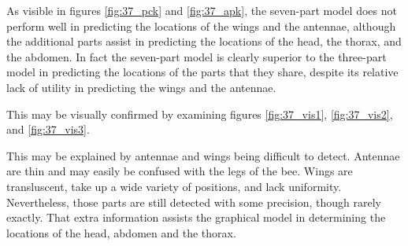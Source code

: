 \documentclass[11pt, oneside]{report}
\begin{document}
        As visible in figures \ref{fig:37_pck} and \ref{fig:37_apk}, the seven-part model does not perform well in predicting the locations of the wings and the antennae, although the additional parts assist in predicting the locations of the head, the thorax, and the abdomen. In fact the seven-part model is clearly superior to the three-part model in predicting the locations of the parts that they share, despite its relative lack of utility in predicting the wings and the antennae.

        This may be visually confirmed by examining figures \ref{fig:37_vis1}, \ref{fig:37_vis2}, and \ref{fig:37_vis3}.

        This may be explained by antennae and wings being difficult to detect. Antennae are thin and may easily be confused with the legs of the bee. Wings are transluscent, take up a wide variety of positions, and lack uniformity. Nevertheless, those parts are still detected with some precision, though rarely exactly. That extra information assists the graphical model in determining the locations of the head, abdomen and the thorax.
\end{document}

